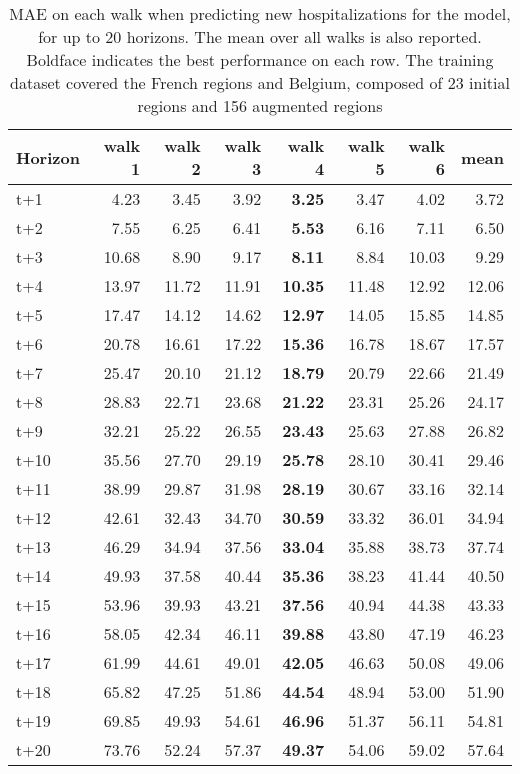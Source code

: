 \begin{table}[H]
\centering
\caption{MAE on each walk when predicting new hospitalizations for the model, for up to 20 horizons. The mean over all walks is also reported. Boldface indicates the best performance on each row. The training dataset covered the French regions and Belgium, composed of 23 initial regions and 156 augmented regions }
\label{tab:MAE_walk_custom_linear_regression}
\begin{tabular}{lrrrrrrr}
\toprule
Horizon &  walk 1 &  walk 2 &  walk 3 &  walk 4 &  walk 5 &  walk 6 &  mean \\
\midrule
t+1  & 4.23  & 3.45  & 3.92  & \textbf{3.25}  & 3.47  & 4.02  & 3.72  \\
t+2  & 7.55  & 6.25  & 6.41  & \textbf{5.53}  & 6.16  & 7.11  & 6.50  \\
t+3  & 10.68  & 8.90  & 9.17  & \textbf{8.11}  & 8.84  & 10.03  & 9.29  \\
t+4  & 13.97  & 11.72  & 11.91  & \textbf{10.35}  & 11.48  & 12.92  & 12.06  \\
t+5  & 17.47  & 14.12  & 14.62  & \textbf{12.97}  & 14.05  & 15.85  & 14.85  \\
t+6  & 20.78  & 16.61  & 17.22  & \textbf{15.36}  & 16.78  & 18.67  & 17.57  \\
t+7  & 25.47  & 20.10  & 21.12  & \textbf{18.79}  & 20.79  & 22.66  & 21.49  \\
t+8  & 28.83  & 22.71  & 23.68  & \textbf{21.22}  & 23.31  & 25.26  & 24.17  \\
t+9  & 32.21  & 25.22  & 26.55  & \textbf{23.43}  & 25.63  & 27.88  & 26.82  \\
t+10  & 35.56  & 27.70  & 29.19  & \textbf{25.78}  & 28.10  & 30.41  & 29.46  \\
t+11  & 38.99  & 29.87  & 31.98  & \textbf{28.19}  & 30.67  & 33.16  & 32.14  \\
t+12  & 42.61  & 32.43  & 34.70  & \textbf{30.59}  & 33.32  & 36.01  & 34.94  \\
t+13  & 46.29  & 34.94  & 37.56  & \textbf{33.04}  & 35.88  & 38.73  & 37.74  \\
t+14  & 49.93  & 37.58  & 40.44  & \textbf{35.36}  & 38.23  & 41.44  & 40.50  \\
t+15  & 53.96  & 39.93  & 43.21  & \textbf{37.56}  & 40.94  & 44.38  & 43.33  \\
t+16  & 58.05  & 42.34  & 46.11  & \textbf{39.88}  & 43.80  & 47.19  & 46.23  \\
t+17  & 61.99  & 44.61  & 49.01  & \textbf{42.05}  & 46.63  & 50.08  & 49.06  \\
t+18  & 65.82  & 47.25  & 51.86  & \textbf{44.54}  & 48.94  & 53.00  & 51.90  \\
t+19  & 69.85  & 49.93  & 54.61  & \textbf{46.96}  & 51.37  & 56.11  & 54.81  \\
t+20  & 73.76  & 52.24  & 57.37  & \textbf{49.37}  & 54.06  & 59.02  & 57.64  \\

\bottomrule
\end{tabular}
\end{table}
